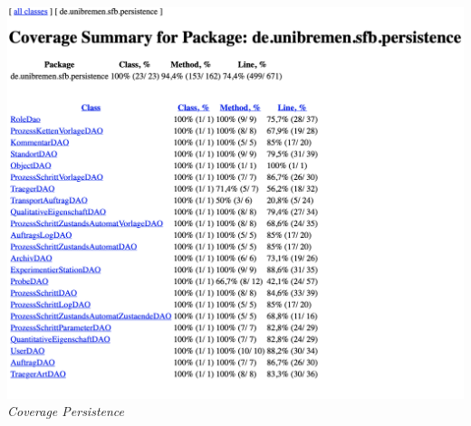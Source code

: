 \documentclass[enabledeprecatedfontcommands,fontsize=12pt,paper=a4,twoside]{scrartcl}
\begin{document}
 \hypertarget{3.4.1.4}{
\includegraphics[width=1\textwidth]{Screenshots/persistence.png}
\textit{ Coverage Persistence}
} \\


\end{document}
